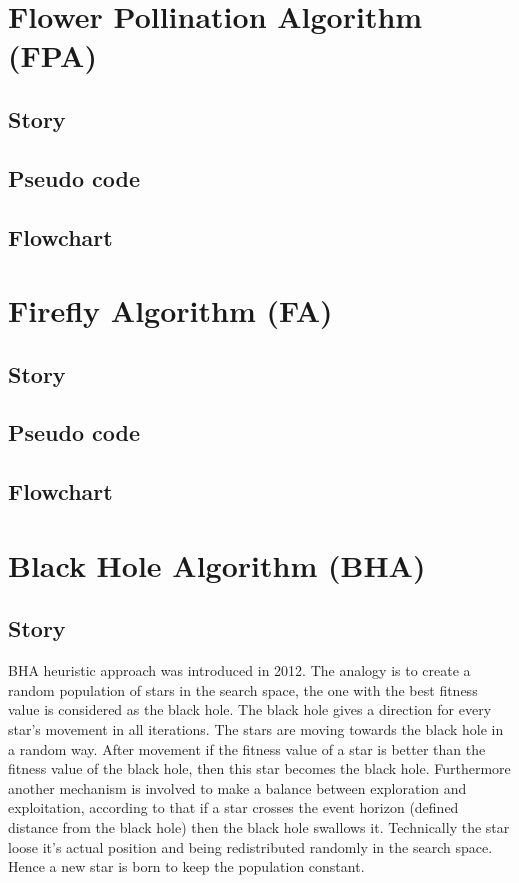\documentclass[border=0.2cm]{report}
\begin{document}
\chapter{Flower Pollination Algorithm (FPA)}
\section{Story}
\section{Pseudo code}
\section{Flowchart}

\chapter{Firefly Algorithm (FA)}
\section{Story}
\section{Pseudo code}
\section{Flowchart}

\chapter{Black Hole Algorithm (BHA)}
\section{Story}

BHA \cite{bha1, bha2} heuristic approach was introduced in 2012. The analogy is to create a random population of stars in the search space, the one with the best fitness value is considered as the black hole. The black hole gives a direction for every star's movement in all iterations. The stars are moving towards the black hole in a random way. After movement if the fitness value of a star is better than the fitness value of the black hole, then this star becomes the black hole. Furthermore another mechanism is involved to make a balance between exploration and exploitation, according to that if a star crosses the event horizon (defined distance from the black hole) then the black hole swallows it. Technically the star loose it's actual position and being redistributed randomly in the search space. Hence a new star is born to keep the population constant. \\
\end{document}
